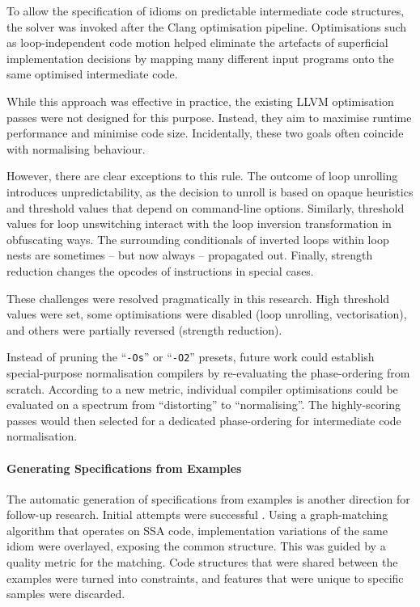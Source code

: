     To allow the specification of idioms on predictable intermediate code
    structures, the solver was invoked after the Clang optimisation pipeline.
    Optimisations such as loop-independent code motion helped eliminate the
    artefacts of superficial implementation decisions by mapping many different
    input programs onto the same optimised intermediate code.

    While this approach was effective in practice, the existing LLVM
    optimisation passes were not designed for this purpose.
    Instead, they aim to maximise runtime performance and minimise code size.
    Incidentally, these two goals often coincide with normalising behaviour.

    However, there are clear exceptions to this rule.
    The outcome of loop unrolling introduces unpredictability, as the decision
    to unroll is based on opaque heuristics and threshold values that depend
    on command-line options.
    Similarly, threshold values for loop unswitching interact with the loop
    inversion transformation in obfuscating ways.
    The surrounding conditionals of inverted loops within loop nests are
    sometimes -- but now always -- propagated out.
    Finally, strength reduction changes the opcodes of instructions in special
    cases.

    These challenges were resolved pragmatically in this research.
    High threshold values were set, some optimisations were disabled
    (loop unrolling, vectorisation), and others were partially reversed
    (strength reduction).

    Instead of pruning the ``{\tt-Os}'' or ``{\tt -O2}'' presets, future work
    could establish special-purpose normalisation compilers by re-evaluating the
    phase-ordering from scratch.
    According to a new metric, individual compiler optimisations could be
    evaluated on a spectrum from ``distorting'' to ``normalising''.
    The highly-scoring passes would then selected for a dedicated
    phase-ordering for intermediate code normalisation.

    \paragraph*{Generating Specifications from Examples}
    The automatic generation of specifications from examples is another
    direction for follow-up research.
    Initial attempts were successful \citep{DBLP:conf/IEEEpact/CollieGO19}.
    Using a graph-matching algorithm that operates on SSA code, implementation
    variations of the same idiom were overlayed, exposing the common structure.
    This was guided by a quality metric for the matching.
    Code structures that were shared between the examples were turned into
    constraints, and features that were unique to specific samples were
    discarded.

